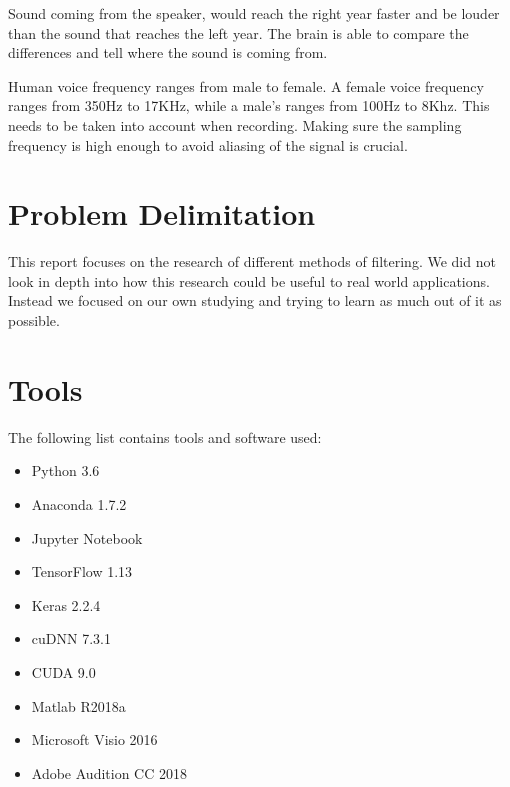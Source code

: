 Sound coming from the speaker, would reach  the right year faster and be louder than 
the sound that reaches the left year. The brain is able to compare the differences
and tell where the sound is coming from.

Human voice frequency ranges from male to female. A female voice frequency ranges from 
350Hz to 17KHz, while a male's ranges from 100Hz to 8Khz. This needs to be taken into
account when recording. Making sure the sampling frequency is high enough to avoid 
aliasing of the signal is crucial.\cite{VOICEFREQUENCY}
\newpage
\section{Problem Delimitation}
This report focuses on the research of different methods of filtering. We did not
look in depth into how this research could be useful to real world applications. Instead we 
focused on our own studying and trying to learn as much out of it as possible.
\section{Tools}
The following list contains tools and software used:
\begin{itemize}
\item Python 3.6
\item Anaconda 1.7.2
\item Jupyter Notebook
\item TensorFlow 1.13
\item Keras 2.2.4
\item cuDNN 7.3.1
\item CUDA 9.0
\item Matlab R2018a
\item Microsoft Visio 2016
\item Adobe Audition CC 2018
\end{itemize}